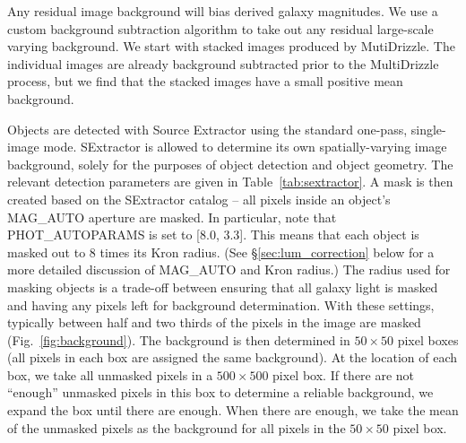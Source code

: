 
Any residual image background will bias derived galaxy magnitudes. We
use a custom background subtraction algorithm to take out any residual
large-scale varying background. We start with stacked images produced
by {\sc MutiDrizzle}. The individual images are already background
subtracted prior to the {\sc MultiDrizzle} process, but we find that
the stacked images have a small positive mean background.

Objects are detected with Source Extractor 
\citep[{\sc SExtractor};][]{bertin96a} using the standard
one-pass, single-image mode. {\sc SExtractor} is allowed to determine
its own spatially-varying image background, solely for the purposes of
object detection and object geometry. The relevant detection
parameters are given in Table~\ref{tab:sextractor}. A mask is then
created based on the {\sc SExtractor} catalog -- all pixels inside an
object's MAG\_AUTO aperture are masked. In particular, note that
PHOT\_AUTOPARAMS is set to [8.0, 3.3]. This means that each object is
masked out to 8 times its Kron radius. (See \S\ref{sec:lum_correction}
below for a more detailed discussion of MAG\_AUTO and Kron radius.)
The radius used for masking objects is a trade-off between ensuring
that all galaxy light is masked and having any pixels left for
background determination. With these settings, typically between
half and two thirds of the pixels in the image are masked
(Fig.~\ref{fig:background}). The background is then determined in
$50 \times 50$ pixel boxes (all pixels in each box are assigned the
same background). At the location of each box, we take all unmasked
pixels in a $500 \times 500$ pixel box. If there are not ``enough''
unmasked pixels in this box to determine a reliable background, we
expand the box until there are enough. When there are enough, we take
the mean of the unmasked pixels as the background for all pixels in
the $50 \times 50$ pixel box.

